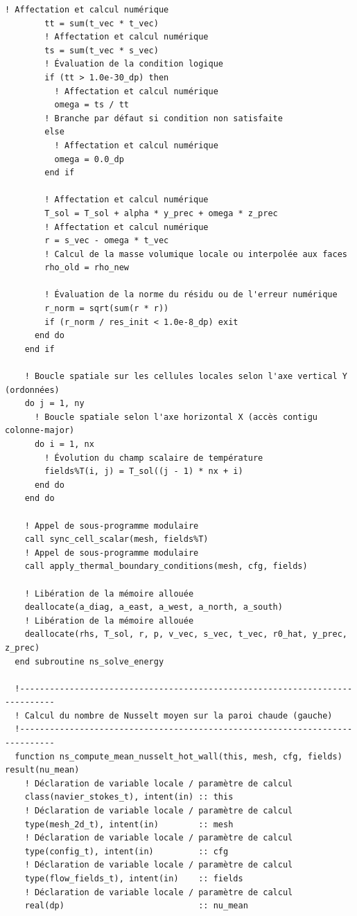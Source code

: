 \documentclass[10pt,a4paper,oneside]{book}
\begin{document}
\begin{lstlisting}[language={[95]Fortran}]
        ! Affectation et calcul numérique
        tt = sum(t_vec * t_vec)
        ! Affectation et calcul numérique
        ts = sum(t_vec * s_vec)
        ! Évaluation de la condition logique
        if (tt > 1.0e-30_dp) then
          ! Affectation et calcul numérique
          omega = ts / tt
        ! Branche par défaut si condition non satisfaite
        else
          ! Affectation et calcul numérique
          omega = 0.0_dp
        end if

        ! Affectation et calcul numérique
        T_sol = T_sol + alpha * y_prec + omega * z_prec
        ! Affectation et calcul numérique
        r = s_vec - omega * t_vec
        ! Calcul de la masse volumique locale ou interpolée aux faces
        rho_old = rho_new

        ! Évaluation de la norme du résidu ou de l'erreur numérique
        r_norm = sqrt(sum(r * r))
        if (r_norm / res_init < 1.0e-8_dp) exit
      end do
    end if

    ! Boucle spatiale sur les cellules locales selon l'axe vertical Y (ordonnées)
    do j = 1, ny
      ! Boucle spatiale selon l'axe horizontal X (accès contigu colonne-major)
      do i = 1, nx
        ! Évolution du champ scalaire de température
        fields%T(i, j) = T_sol((j - 1) * nx + i)
      end do
    end do

    ! Appel de sous-programme modulaire
    call sync_cell_scalar(mesh, fields%T)
    ! Appel de sous-programme modulaire
    call apply_thermal_boundary_conditions(mesh, cfg, fields)

    ! Libération de la mémoire allouée
    deallocate(a_diag, a_east, a_west, a_north, a_south)
    ! Libération de la mémoire allouée
    deallocate(rhs, T_sol, r, p, v_vec, s_vec, t_vec, r0_hat, y_prec, z_prec)
  end subroutine ns_solve_energy

  !-----------------------------------------------------------------------------
  ! Calcul du nombre de Nusselt moyen sur la paroi chaude (gauche)
  !-----------------------------------------------------------------------------
  function ns_compute_mean_nusselt_hot_wall(this, mesh, cfg, fields) result(nu_mean)
    ! Déclaration de variable locale / paramètre de calcul
    class(navier_stokes_t), intent(in) :: this
    ! Déclaration de variable locale / paramètre de calcul
    type(mesh_2d_t), intent(in)        :: mesh
    ! Déclaration de variable locale / paramètre de calcul
    type(config_t), intent(in)         :: cfg
    ! Déclaration de variable locale / paramètre de calcul
    type(flow_fields_t), intent(in)    :: fields
    ! Déclaration de variable locale / paramètre de calcul
    real(dp)                           :: nu_mean


\end{lstlisting}
\end{document}
